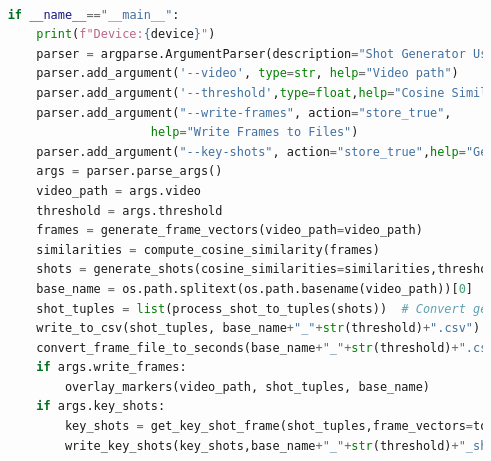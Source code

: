 \documentclass[12pt]{report}
\begin{document}
\begin{lstlisting}[language=Python,caption={Shot Boundary Detection Code}]
		
	if __name__=="__main__":
		print(f"Device:{device}")
		parser = argparse.ArgumentParser(description="Shot Generator Using Cosine Similarity")
		parser.add_argument('--video', type=str, help="Video path")
		parser.add_argument('--threshold',type=float,help="Cosine Similarity Threshold")
		parser.add_argument("--write-frames", action="store_true", 
						help="Write Frames to Files")
		parser.add_argument("--key-shots", action="store_true",help="Get Key Shots")
		args = parser.parse_args()
		video_path = args.video
		threshold = args.threshold
		frames = generate_frame_vectors(video_path=video_path)
		similarities = compute_cosine_similarity(frames)
		shots = generate_shots(cosine_similarities=similarities,threshold=threshold)
		base_name = os.path.splitext(os.path.basename(video_path))[0]
		shot_tuples = list(process_shot_to_tuples(shots))  # Convert generator to list
		write_to_csv(shot_tuples, base_name+"_"+str(threshold)+".csv")
		convert_frame_file_to_seconds(base_name+"_"+str(threshold)+".csv",video_path,base_name+"_"+str(threshold)+".csv")
		if args.write_frames:
			overlay_markers(video_path, shot_tuples, base_name)
		if args.key_shots:
			key_shots = get_key_shot_frame(shot_tuples,frame_vectors=torch.cat(list(generate_frame_vectors(video_path=video_path))))
			write_key_shots(key_shots,base_name+"_"+str(threshold)+"_shots.csv")
			
	
		
			
		
		
\end{lstlisting}
\end{document}
